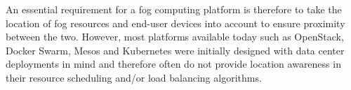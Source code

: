 \documentclass[letterpaper,twocolumn,10pt]{article}
\begin{document}


An essential requirement for a fog computing platform is therefore to
take the location of fog resources and end-user devices into account
to ensure proximity between the two. However, most platforms available
today such as OpenStack, Docker Swarm, Mesos and Kubernetes were
initially designed with data center deployments in mind and therefore
often do not provide location awareness in their resource scheduling
and/or load balancing algorithms.






\end{document}
